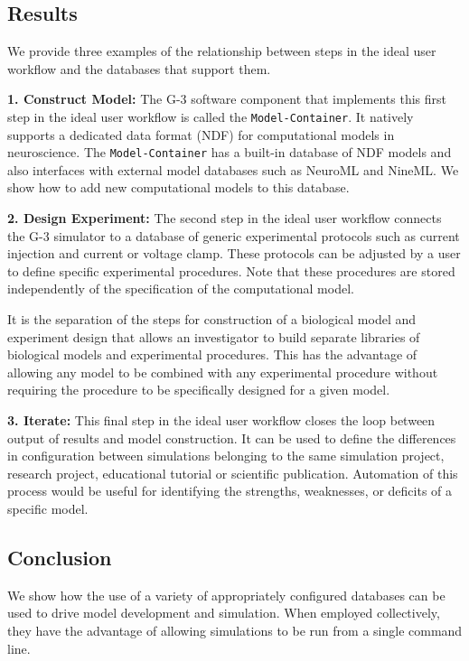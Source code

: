 \documentclass[12pt]{article}
\begin{document}
\subsection*{Results}

We provide three examples of the relationship between steps in the ideal user workflow and the databases that support them.

{\bf 1. Construct Model:} The G-3 software component that implements this first step in the ideal
user workflow is called the {\tt Model-Container}.  It
natively supports a dedicated data format (NDF) for computational models in neuroscience.  The {\tt Model-Container} has a built-in database of NDF models and also interfaces with  external model databases such as NeuroML and NineML.  We
show how to add new computational models to this database.

{\bf 2. Design Experiment:} The second step in the ideal user workflow connects the G-3 simulator
to a database of generic experimental protocols such as current injection and current or voltage
clamp.  These protocols can be adjusted by a user to define specific experimental procedures. 
Note that these procedures are stored independently of the specification
of the computational model.

It is the separation of the steps for construction of a biological model and
experiment design that allows an investigator to build separate libraries of
biological models and experimental procedures.  This has the advantage of
allowing any model to be combined with any experimental
procedure without requiring the procedure to be specifically designed for a given model.  

{\bf 3. Iterate:} This final step in the ideal user workflow closes the loop between output of results and model construction.
It can be used to define the differences in configuration between simulations belonging to the same simulation
project, research project, educational tutorial or scientific publication. Automation of this process would be
useful for identifying the strengths, weaknesses, or deficits of a specific model.

\subsection*{Conclusion}

We show how the use of a variety of appropriately configured
databases can be used to drive model development and simulation.
When employed collectively, they have the advantage of allowing simulations
to be run from a single command line.
\end{document}
